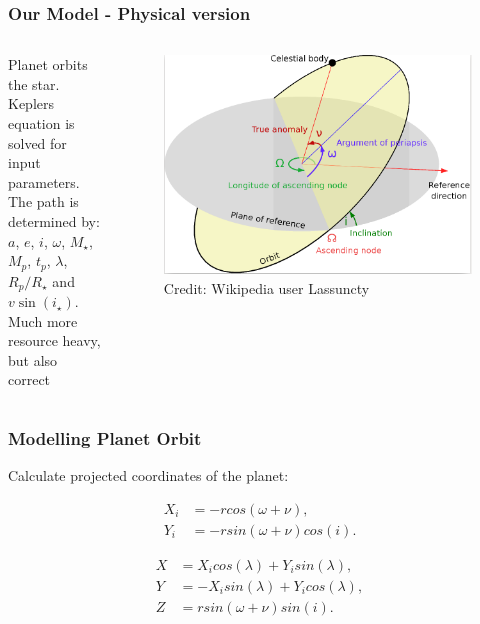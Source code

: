 \documentclass[show notes]{beamer}
\begin{document}
\begin{frame}
\frametitle{Our Model - Physical version}
\begin{columns}
		Planet orbits the star.\\
		
		Keplers equation is solved for input parameters.\\

		The path is determined by:\\
		 $ a $, $ e $, $ i $, $ \omega $, $ M_{\star} $, $ M_p $, $ t_p $, $ \lambda $, $ R_p/R_{\star} $ and $ v\sin(i_{\star}) $.\\
		
		Much more resource heavy, but also correct
		
		\begin{figure}
			\centering
			\includegraphics[width=\textwidth]{../figures/kepler.png}
			\caption{Credit: Wikipedia user Lassuncty}
			\label{fig:orbit}
		\end{figure}
\end{columns}

\end{frame}

\begin{frame}
\frametitle{Modelling Planet Orbit}
Calculate projected coordinates of the planet:

\begin{align*}
X_i& = -r cos(\omega + \nu), \\
Y_i& = -r sin(\omega + \nu) cos(i).
\end{align*}

\begin{align*}
X& = X_i cos(\lambda) + Y_i sin(\lambda), \\
Y& = -X_i sin(\lambda) + Y_i cos(\lambda), \\
Z& = r sin(\omega + \nu) sin(i).
\end{align*}
\end{frame}
\end{document}
